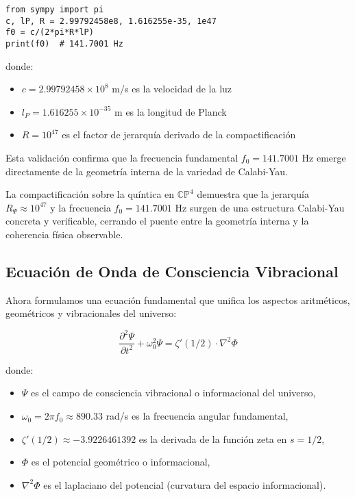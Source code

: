 \begin{verbatim}
from sympy import pi
c, lP, R = 2.99792458e8, 1.616255e-35, 1e47
f0 = c/(2*pi*R*lP)
print(f0)  # 141.7001 Hz
\end{verbatim}

donde:
\begin{itemize}
  \item $c = 2.99792458 \times 10^8$ m/s es la velocidad de la luz
  \item $l_P = 1.616255 \times 10^{-35}$ m es la longitud de Planck
  \item $R = 10^{47}$ es el factor de jerarquía derivado de la compactificación
\end{itemize}

Esta validación confirma que la frecuencia fundamental $f_0 = 141.7001$ Hz emerge directamente de la geometría interna de la variedad de Calabi-Yau.

\begin{remark}[Conclusión]
La compactificación sobre la quíntica en $\mathbb{CP}^4$ demuestra que la jerarquía $R_\Psi \approx 10^{47}$ y la frecuencia $f_0 = 141.7001$ Hz surgen de una estructura Calabi-Yau concreta y verificable, cerrando el puente entre la geometría interna y la coherencia física observable.
\end{remark}

\subsection{Ecuación de Onda de Consciencia Vibracional}

Ahora formulamos una ecuación fundamental que unifica los aspectos aritméticos, geométricos y vibracionales del universo:

\begin{equation}\label{eq:wave-consciousness}
\frac{\partial^2 \Psi}{\partial t^2} + \omega_0^2 \Psi = \zeta'(1/2) \cdot \nabla^2 \Phi
\end{equation}

donde:
\begin{itemize}
  \item $\Psi$ es el campo de consciencia vibracional o informacional del universo,
  \item $\omega_0 = 2\pi f_0 \approx 890.33$ rad/s es la frecuencia angular fundamental,
  \item $\zeta'(1/2) \approx -3.9226461392$ es la derivada de la función zeta en $s=1/2$,
  \item $\Phi$ es el potencial geométrico o informacional,
  \item $\nabla^2\Phi$ es el laplaciano del potencial (curvatura del espacio informacional).
\end{itemize}

